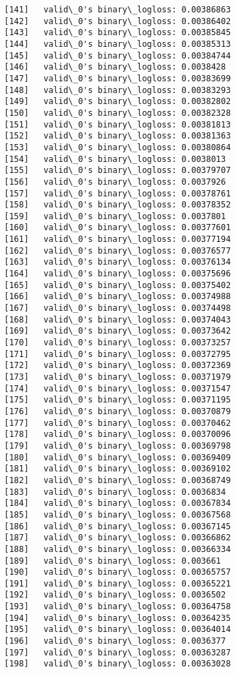 \documentclass[11pt]{article}
\begin{document}
\begin{Verbatim}[commandchars=\\\{\}]
[141]	valid\_0's binary\_logloss: 0.00386863
[142]	valid\_0's binary\_logloss: 0.00386402
[143]	valid\_0's binary\_logloss: 0.00385845
[144]	valid\_0's binary\_logloss: 0.00385313
[145]	valid\_0's binary\_logloss: 0.00384744
[146]	valid\_0's binary\_logloss: 0.0038428
[147]	valid\_0's binary\_logloss: 0.00383699
[148]	valid\_0's binary\_logloss: 0.00383293
[149]	valid\_0's binary\_logloss: 0.00382802
[150]	valid\_0's binary\_logloss: 0.00382328
[151]	valid\_0's binary\_logloss: 0.00381813
[152]	valid\_0's binary\_logloss: 0.00381363
[153]	valid\_0's binary\_logloss: 0.00380864
[154]	valid\_0's binary\_logloss: 0.0038013
[155]	valid\_0's binary\_logloss: 0.00379707
[156]	valid\_0's binary\_logloss: 0.0037926
[157]	valid\_0's binary\_logloss: 0.00378761
[158]	valid\_0's binary\_logloss: 0.00378352
[159]	valid\_0's binary\_logloss: 0.0037801
[160]	valid\_0's binary\_logloss: 0.00377601
[161]	valid\_0's binary\_logloss: 0.00377194
[162]	valid\_0's binary\_logloss: 0.00376577
[163]	valid\_0's binary\_logloss: 0.00376134
[164]	valid\_0's binary\_logloss: 0.00375696
[165]	valid\_0's binary\_logloss: 0.00375402
[166]	valid\_0's binary\_logloss: 0.00374988
[167]	valid\_0's binary\_logloss: 0.00374498
[168]	valid\_0's binary\_logloss: 0.00374043
[169]	valid\_0's binary\_logloss: 0.00373642
[170]	valid\_0's binary\_logloss: 0.00373257
[171]	valid\_0's binary\_logloss: 0.00372795
[172]	valid\_0's binary\_logloss: 0.00372369
[173]	valid\_0's binary\_logloss: 0.00371979
[174]	valid\_0's binary\_logloss: 0.00371547
[175]	valid\_0's binary\_logloss: 0.00371195
[176]	valid\_0's binary\_logloss: 0.00370879
[177]	valid\_0's binary\_logloss: 0.00370462
[178]	valid\_0's binary\_logloss: 0.00370096
[179]	valid\_0's binary\_logloss: 0.00369798
[180]	valid\_0's binary\_logloss: 0.00369409
[181]	valid\_0's binary\_logloss: 0.00369102
[182]	valid\_0's binary\_logloss: 0.00368749
[183]	valid\_0's binary\_logloss: 0.0036834
[184]	valid\_0's binary\_logloss: 0.00367834
[185]	valid\_0's binary\_logloss: 0.00367568
[186]	valid\_0's binary\_logloss: 0.00367145
[187]	valid\_0's binary\_logloss: 0.00366862
[188]	valid\_0's binary\_logloss: 0.00366334
[189]	valid\_0's binary\_logloss: 0.003661
[190]	valid\_0's binary\_logloss: 0.00365757
[191]	valid\_0's binary\_logloss: 0.00365221
[192]	valid\_0's binary\_logloss: 0.0036502
[193]	valid\_0's binary\_logloss: 0.00364758
[194]	valid\_0's binary\_logloss: 0.00364235
[195]	valid\_0's binary\_logloss: 0.00364014
[196]	valid\_0's binary\_logloss: 0.0036377
[197]	valid\_0's binary\_logloss: 0.00363287
[198]	valid\_0's binary\_logloss: 0.00363028

\end{Verbatim}
\end{document}
